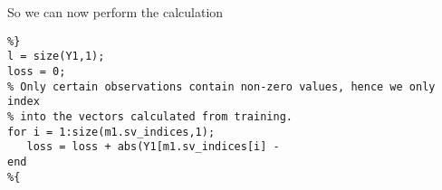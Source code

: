 \documentclass[11pt, twoside]{article}   	%
\begin{document}
\begin{itemize}
So we can now perform the calculation

\begin{lstlisting}
%}
l = size(Y1,1); 
loss = 0; 
% Only certain observations contain non-zero values, hence we only index
% into the vectors calculated from training. 
for i = 1:size(m1.sv_indices,1); 
   loss = loss + abs(Y1[m1.sv_indices[i] - 
end
%{
\end{lstlisting}

\end{itemize}
\end{document}
